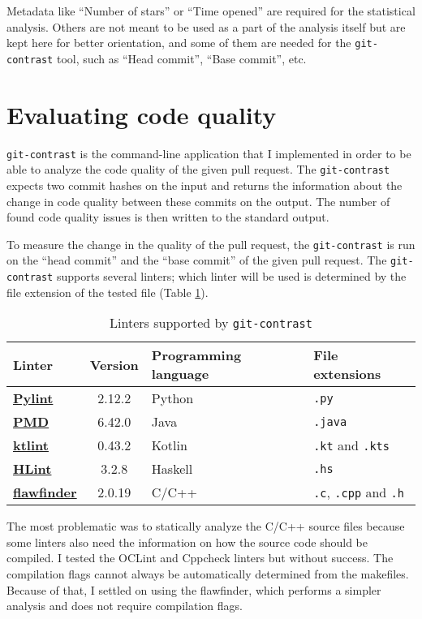 \documentclass[digital,oneside,oldtable,nolof,nolot,nocover]{fithesis4}
\begin{document}
Metadata like ``Number of stars'' or ``Time opened'' are required for the
statistical analysis.  Others are not meant to be used as a part of the
analysis itself but are kept here for better orientation, and some of them
are needed for the \texttt{git-contrast} tool, such as ``Head commit'', ``Base commit'', etc.
\section{Evaluating code quality}
\label{sec:orgaa914b8}
\texttt{git-contrast} is the command-line application that I implemented in order to
be able to analyze the code quality of the given pull request. The \texttt{git-contrast}
expects two commit hashes on the input and returns the information about the
change in code quality between these commits on the output.
The number of found code quality issues is
then written to the standard output.

To measure the change in the quality of the pull request, the
\texttt{git-contrast} is run on the ``head commit'' and the ``base commit'' of the given
pull request. The \texttt{git-contrast} supports several linters; which linter will be
used is determined by the file extension of the tested file (Table \ref{tab:orge4d7aab}).
\begin{table}[htbp]
\caption{\label{tab:orge4d7aab}Linters supported by \texttt{git-contrast}}
\centering
\begin{tabular}{|lcll|}
\hline
Linter & Version & Programming language & File extensions\\
\hline
\hline
\href{https://pylint.pycqa.org/}{\textbf{Pylint}} & 2.12.2 & Python & \texttt{.py}\\
\href{https://pmd.github.io/}{\textbf{PMD}} & 6.42.0 & Java & \texttt{.java}\\
\href{https://ktlint.github.io/}{\textbf{ktlint}} & 0.43.2 & Kotlin & \texttt{.kt} and \texttt{.kts}\\
\href{https://github.com/ndmitchell/hlint}{\textbf{HLint}} & 3.2.8 & Haskell & \texttt{.hs}\\
\href{https://dwheeler.com/flawfinder/}{\textbf{flawfinder}} & 2.0.19 & C/C++ & \texttt{.c}, \texttt{.cpp} and \texttt{.h}\\
\hline
\end{tabular}
\end{table}

The most problematic was to statically analyze the C/C++ source files because
some linters also need the information on how the source code should be
compiled. I tested the OCLint and Cppcheck linters but without success.
The compilation flags cannot always be automatically determined from the makefiles.
Because of that, I settled on using the flawfinder, which performs a simpler analysis and
does not require compilation flags.
\end{document}
